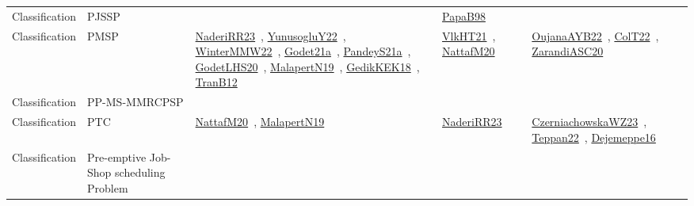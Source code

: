 {\begin{longtable}{lp{3cm}>{\raggedright\arraybackslash}p{6cm}>{\raggedright\arraybackslash}p{6cm}>{\raggedright\arraybackslash}p{8cm}}
Classification & PJSSP &  & \href{works/PapaB98.pdf}{PapaB98}~\cite{PapaB98} & \\
Classification & PMSP & \href{works/NaderiRR23.pdf}{NaderiRR23}~\cite{NaderiRR23}, \href{works/YunusogluY22.pdf}{YunusogluY22}~\cite{YunusogluY22}, \href{works/WinterMMW22.pdf}{WinterMMW22}~\cite{WinterMMW22}, \href{works/Godet21a.pdf}{Godet21a}~\cite{Godet21a}, \href{works/PandeyS21a.pdf}{PandeyS21a}~\cite{PandeyS21a}, \href{works/GodetLHS20.pdf}{GodetLHS20}~\cite{GodetLHS20}, \href{works/MalapertN19.pdf}{MalapertN19}~\cite{MalapertN19}, \href{works/GedikKEK18.pdf}{GedikKEK18}~\cite{GedikKEK18}, \href{works/TranB12.pdf}{TranB12}~\cite{TranB12} & \href{works/VlkHT21.pdf}{VlkHT21}~\cite{VlkHT21}, \href{works/NattafM20.pdf}{NattafM20}~\cite{NattafM20} & \href{works/OujanaAYB22.pdf}{OujanaAYB22}~\cite{OujanaAYB22}, \href{works/ColT22.pdf}{ColT22}~\cite{ColT22}, \href{works/ZarandiASC20.pdf}{ZarandiASC20}~\cite{ZarandiASC20}\\
Classification & PP-MS-MMRCPSP &  &  & \\
Classification & PTC & \href{works/NattafM20.pdf}{NattafM20}~\cite{NattafM20}, \href{works/MalapertN19.pdf}{MalapertN19}~\cite{MalapertN19} & \href{works/NaderiRR23.pdf}{NaderiRR23}~\cite{NaderiRR23} & \href{works/CzerniachowskaWZ23.pdf}{CzerniachowskaWZ23}~\cite{CzerniachowskaWZ23}, \href{works/Teppan22.pdf}{Teppan22}~\cite{Teppan22}, \href{works/Dejemeppe16.pdf}{Dejemeppe16}~\cite{Dejemeppe16}\\
Classification & Pre-emptive Job-Shop scheduling Problem &  &  & \\

\end{longtable}}
